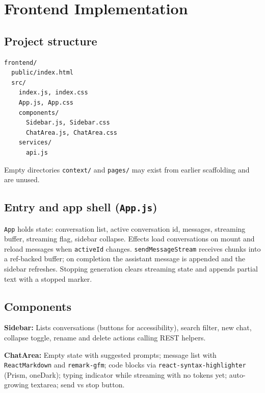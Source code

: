 \documentclass[11pt,a4paper]{article}
\begin{document}
\section{Frontend Implementation}

\subsection{Project structure}

\begin{lstlisting}
frontend/
  public/index.html
  src/
    index.js, index.css
    App.js, App.css
    components/
      Sidebar.js, Sidebar.css
      ChatArea.js, ChatArea.css
    services/
      api.js
\end{lstlisting}

Empty directories \texttt{context/} and \texttt{pages/} may exist from earlier scaffolding and are unused.

\subsection{Entry and app shell (\texttt{App.js})}

\texttt{App} holds state: conversation list, active conversation id, messages, streaming buffer, streaming flag, sidebar collapse. Effects load conversations on mount and reload messages when \texttt{activeId} changes. \texttt{sendMessageStream} receives chunks into a ref-backed buffer; on completion the assistant message is appended and the sidebar refreshes. Stopping generation clears streaming state and appends partial text with a stopped marker.

\subsection{Components}

\textbf{Sidebar:} Lists conversations (buttons for accessibility), search filter, new chat, collapse toggle, rename and delete actions calling REST helpers.

\textbf{ChatArea:} Empty state with suggested prompts; message list with \texttt{ReactMarkdown} and \texttt{remark-gfm}; code blocks via \texttt{react-syntax-highlighter} (Prism, oneDark); typing indicator while streaming with no tokens yet; auto-growing textarea; send vs stop button.
\end{document}
